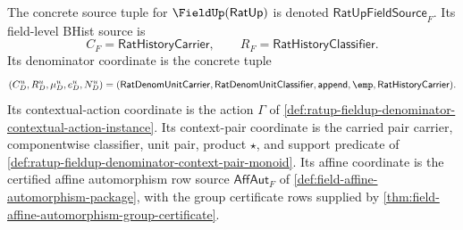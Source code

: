 \begin{definition}
\label{def:ratup-fieldup-concrete-source-tuple}
The concrete source tuple for $\FieldUp(\mathsf{RatUp})$ is denoted
$\mathsf{RatUpFieldSource}_F$. Its field-level BHist source is
$$
C_F=\mathsf{RatHistoryCarrier},\qquad
R_F=\mathsf{RatHistoryClassifier}.
$$
Its denominator coordinate is the concrete tuple
$$
(C_D^u,R_D^u,\mu_D^u,e_D^u,N_D^u)=
(\mathsf{RatDenomUnitCarrier},\mathsf{RatDenomUnitClassifier},
\mathsf{append},\emp,\mathsf{RatHistoryCarrier}).
$$
Its contextual-action coordinate is the action $\Gamma$ of
\autoref{def:ratup-fieldup-denominator-contextual-action-instance}. Its
context-pair coordinate is the carried pair carrier, componentwise classifier,
unit pair, product $\star$, and support predicate of
\autoref{def:ratup-fieldup-denominator-context-pair-monoid}. Its affine
coordinate is the certified affine automorphism row source
$\mathsf{AffAut}_F$ of
\autoref{def:field-affine-automorphism-package}, with the group certificate
rows supplied by \autoref{thm:field-affine-automorphism-group-certificate}.
\end{definition}

